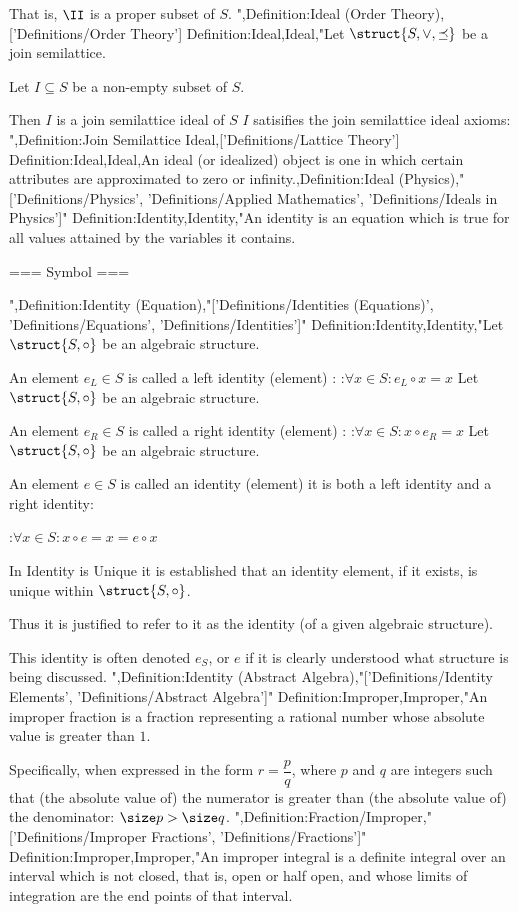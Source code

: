 That is,  $\II$ is a proper subset of $S$.
",Definition:Ideal (Order Theory),['Definitions/Order Theory']
Definition:Ideal,Ideal,"Let $\struct {S, \vee, \preceq}$ be a join semilattice.

Let $I \subseteq S$ be a non-empty subset of $S$.


Then $I$ is a join semilattice ideal of $S$  $I$ satisifies the join semilattice ideal axioms:
",Definition:Join Semilattice Ideal,['Definitions/Lattice Theory']
Definition:Ideal,Ideal,An ideal (or idealized) object is one in which certain attributes are approximated to zero or infinity.,Definition:Ideal (Physics),"['Definitions/Physics', 'Definitions/Applied Mathematics', 'Definitions/Ideals in Physics']"
Definition:Identity,Identity,"An identity is an equation which is true for all values attained by the variables it contains.


=== Symbol ===

",Definition:Identity (Equation),"['Definitions/Identities (Equations)', 'Definitions/Equations', 'Definitions/Identities']"
Definition:Identity,Identity,"Let $\struct {S, \circ}$ be an algebraic structure.

An element $e_L \in S$ is called a left identity (element) :
:$\forall x \in S: e_L \circ x = x$
Let $\struct {S, \circ}$ be an algebraic structure.

An element $e_R \in S$ is called a right identity (element) :
:$\forall x \in S: x \circ e_R = x$
Let $\struct {S, \circ}$ be an algebraic structure.

An element $e \in S$ is called an identity (element)  it is both a left identity and a right identity:

:$\forall x \in S: x \circ e = x = e \circ x$


In Identity is Unique it is established that an identity element, if it exists, is unique within $\struct {S, \circ}$.

Thus it is justified to refer to it as the identity (of a given algebraic structure).


This identity is often denoted $e_S$, or $e$ if it is clearly understood what structure is being discussed.
",Definition:Identity (Abstract Algebra),"['Definitions/Identity Elements', 'Definitions/Abstract Algebra']"
Definition:Improper,Improper,"An improper fraction is a fraction representing a rational number whose absolute value is greater than $1$.

Specifically, when expressed in the form $r = \dfrac p q$, where $p$ and $q$ are integers such that (the absolute value of) the numerator is greater than (the absolute value of) the denominator: $\size p > \size q$.
",Definition:Fraction/Improper,"['Definitions/Improper Fractions', 'Definitions/Fractions']"
Definition:Improper,Improper,"An improper integral is a definite integral over an interval which is not closed, that is, open or half open, and whose limits of integration are the end points of that interval.

